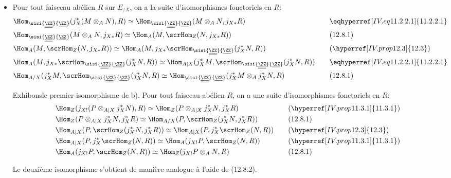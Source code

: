 \begin{itemize}
\item[Démontrons a).] Pour tout faisceau abélien $R$ sur $E_{/X}$, on
a la suite d'isomorphismes fonctoriels en $R$:
\begin{alignat*}{2}
&\Hom_{\sisi{\underline{\underline{\ZZ}}}{\underline{\ZZ}}}(j^{\ast}_X(M\otimes_A N),R)\simeq \Hom_{\sisi{\underline{\underline{\ZZ}}}{\underline{\ZZ}}} (M\otimes_A N,
j_{X\ast}R) &\quad& \eqhyperref[IV.eq11.2.2.1]{11.2.2.1}\\
&\Hom_{\sisi{\underline{\underline{\ZZ}}}{\underline{\ZZ}}}(M\otimes_A N, j_{X\ast}R)\simeq \Hom_A(M, \scrHom_Z(N,
j_{X\ast}R)) && (12.8.1)\\
&\Hom_A (M, \scrHom_Z(N, j_{X\ast}R))\simeq
\Hom_A(M,j_{X\ast}\scrHom_{\sisi{\underline{\underline{\ZZ}}}{\underline{\ZZ}}}(j^{\ast}_XN,R)) && (\hyperref[IV.prop12.3]{12.3})\\
& \Hom_A(M, j_{X\ast}\scrHom_{\sisi{\underline{\underline{\ZZ}}}{\underline{\ZZ}}}(j^{\ast}_XN,R))\simeq \Hom_{A|
X}(j^{\ast}_XM, \scrHom_{\sisi{\underline{\underline{\ZZ}}}{\underline{\ZZ}}} (j^{\ast}_XN,R)) && \eqhyperref[IV.eq11.2.2.1]{11.2.2.1}\\
&\Hom_{A/X}(j^{\ast}_XM, \scrHom_{\sisi{\underline{\underline{\ZZ}}}{\underline{\ZZ}}} (j^{\ast}_XN,R)\simeq \Hom_{\sisi{\underline{\underline{\ZZ}}}{\underline{\ZZ}}}
(j^{\ast}_XM\otimes_A j^{\ast}_X N,R) && (12.8.1)
\end{alignat*}

Exhibons\pageoriginale le premier isomorphisme de b). Pour tout
faisceau abélien $R$, on a une suite d'isomorphismes fonctoriels en
$R$:
\begin{alignat*}{2}
& \Hom_Z(j_{X!}(P\otimes_{A| X}j^{\ast}_XN),R)\simeq
\Hom_Z(P\otimes_{A| X} j^{\ast}_X N, j^{\ast}_X R) &\quad&
(\hyperref[IV.prop11.3.1]{11.3.1})\\
& \Hom_Z(P\otimes_{A| X}j^{\ast}_XN, j^{\ast}_XR)\simeq
\Hom_{A/X}(P,\scrHom_Z(j^{\ast}_XN, j^{\ast}_XR)) && (12.8.1)\\
&\Hom_{A| X}(P,\scrHom_Z (j^{\ast}_XN, j^{\ast}_XR))\simeq
\Hom_{A| X}(P, j^{\ast}_X\scrHom_Z (N,R)) && (\hyperref[IV.prop12.3]{12.3})\\
&\Hom_{A| X}(P, j^{\ast}_X\scrHom_Z(N,R))\simeq \Hom_A (j_{X!}P,
\scrHom_Z (N,R)) && (\hyperref[IV.prop11.3.1]{11.3.1})\\
&\Hom_A (j_{X!}P, \scrHom_Z(N,R))\simeq \Hom_Z (j_{X!}P\otimes_A
N,R) && (12.8.1)
\end{alignat*}

Le deuxième isomorphisme s'obtient de manière analogue à l'aide de
(12.8.2).
\end{itemize}

